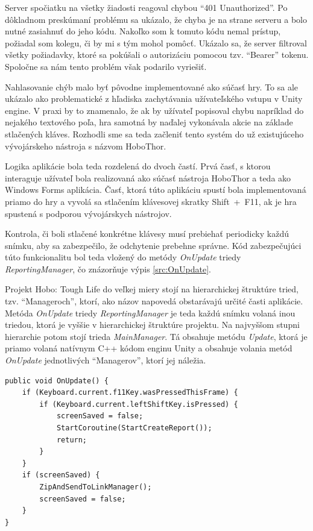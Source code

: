 \documentclass[slovak, bachelorpractice]{diploma}
\begin{document}
Server spočiatku na všetky žiadosti reagoval chybou \enquote{401 Unauthorized}. Po dôkladnom preskúmaní problému sa ukázalo, že chyba je na strane serveru a bolo nutné zasiahnuť do jeho kódu. Nakoľko som k tomuto kódu nemal prístup, požiadal som kolegu, či by mi s tým mohol pomôcť. Ukázalo sa, že server filtroval všetky požiadavky, ktoré sa pokúšali o autorizáciu pomocou tzv. \enquote{Bearer} tokenu. Spoločne sa nám tento problém však podarilo vyriešiť. 

Nahlasovanie chýb malo byť pôvodne implementované ako súčasť hry. To sa ale ukázalo ako problematické z hľadiska zachytávania užívateľského vstupu v Unity engine. V praxi by to znamenalo, že ak by užívateľ popisoval chybu napríklad do nejakého textového poľa, hra samotná by naďalej vykonávala akcie na základe stlačených kláves. Rozhodli sme sa teda začleniť tento systém do už existujúceho vývojárskeho nástroja s názvom HoboThor.

Logika aplikácie bola teda rozdelená do dvoch častí. Prvá časť, s ktorou interaguje užívateľ bola realizovaná ako súčasť nástroja HoboThor a teda ako Windows Forms aplikácia. Časť, ktorá túto aplikáciu spustí bola implementovaná priamo do hry a vyvolá sa stlačením klávesovej skratky \mbox{Shift + F11}, ak je hra spustená s podporou vývojárskych nástrojov. 

Kontrola, či boli stlačené konkrétne klávesy musí prebiehať periodicky každú snímku, aby sa zabezpečilo, že odchytenie prebehne správne. Kód zabezpečujúci túto funkcionalitu bol teda vložený do metódy \textit{OnUpdate} triedy \textit{ReportingManager}, čo znázorňuje výpis \ref{src:OnUpdate}. 

Projekt Hobo: Tough Life do veľkej miery stojí na hierarchickej štruktúre tried, tzv. \enquote{Manageroch}, ktorí, ako názov napovedá obstarávajú určité časti aplikácie. Metóda \textit{OnUpdate} triedy \textit{ReportingManager} je teda každú snímku volaná inou triedou, ktorá je vyššie v hierarchickej štruktúre projektu. Na najvyššom stupni hierarchie potom stojí trieda \textit{MainManager}. Tá obsahuje metódu \textit{Update}, ktorá je priamo volaná natívnym C++ kódom enginu Unity a obsahuje volania metód \textit{OnUpdate} jednotlivých \enquote{Managerov}, ktorí jej náležia.
\vspace{8pt}
\begin{lstlisting}[label=src:OnUpdate,caption={Odchytenie stlačenia klávesovej skratky v spustenej hre}]
public void OnUpdate() {
    if (Keyboard.current.f11Key.wasPressedThisFrame) {
        if (Keyboard.current.leftShiftKey.isPressed) {
            screenSaved = false;
            StartCoroutine(StartCreateReport());
            return;
        }
    }
    if (screenSaved) {
        ZipAndSendToLinkManager();
        screenSaved = false;
    }
}
\end{lstlisting}
\end{document}
